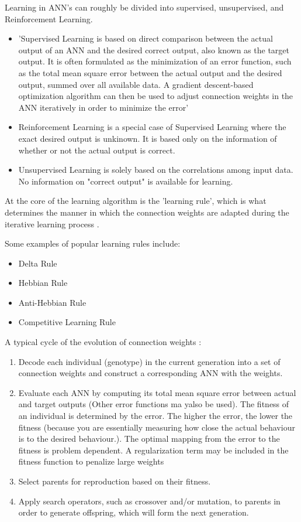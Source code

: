 Learning in ANN's can roughly be divided into supervised, unsupervised, and Reinforcement Learning.
\begin{itemize}
	\item 'Supervised Learning is based on direct comparison between the actual output of an ANN and the desired correct output, also known as the target output. It is often formulated as the minimization of an error function, such as the total mean square error between the actual output and the desired output, summed over all available data. A gradient descent-based optimization algorithm can then be used to adjust connection weights in the ANN iteratively in order to minimize the error'
	\item Reinforcement Learning is a special case of Supervised Learning where the exact desired output is unkinown. It is based only on the information of whether or not the actual output is correct.
	\item Unsupervised Learning is solely based on the correlations among input data. No information on "correct output" is available for learning.
\end{itemize}

At the core of the learning algorithm is the 'learning rule', which is what determines the manner in which the connection weights are adapted during the iterative learning process \cite{XinYao1999}.

Some examples of popular learning rules include:
\begin{itemize}
	\item Delta Rule
	\item Hebbian Rule
	\item Anti-Hebbian Rule
	\item Competitive Learning Rule
\end{itemize}


A typical cycle of the evolution of connection weights \cite{XinYao1999}:
\begin{enumerate}
	\item Decode each individual (genotype) in the current generation into a set of connection weights and construct a corresponding ANN with the weights.
	\item Evaluate each ANN by computing its total mean square error between actual and target outputs (Other error functions ma yalso be used). The fitness of an individual is determined by the error. The higher the error, the lower the fitness (because you are essentially measuring how close the actual behaviour is to the desired behaviour.). The optimal mapping from the error to the fitness is problem dependent. A regularization term may be included in the fitness function to penalize large weights
	\item Select parents for reproduction based on their fitness.
	\item Apply search operators, such as crossover and/or mutation, to parents in order to generate offspring, which will form the next generation.
\end{enumerate}



